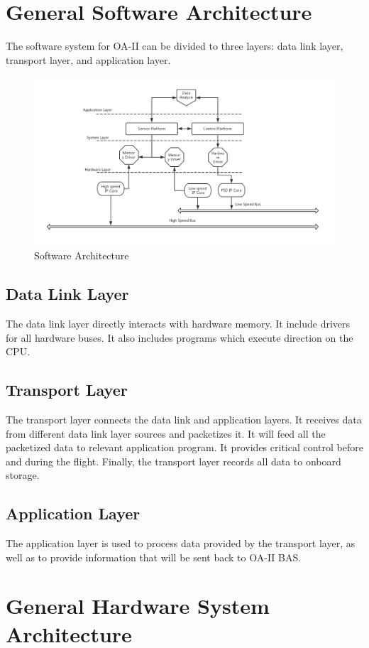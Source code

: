 \documentclass[12pt,article]{memoir}
\begin{document}
\chapter{General Software Architecture}
The software system for OA-II can be divided to three layers: data link layer, transport layer, and application layer.
\begin{figure}[htp]
\includegraphics[width=\textwidth]{ES00002_softarch.png}
\caption{Software Architecture}	
\end{figure}
\section{Data Link Layer}
The data link layer directly interacts with hardware memory. It include drivers for all hardware buses. It also includes programs which execute direction on the CPU.
\section{Transport Layer}
The transport layer connects the data link and application layers. It receives data from different data link layer sources and packetizes it. It will feed all the packetized data to relevant application program. It provides critical control before and during the flight. Finally, the transport layer records all data to onboard storage.
\section{Application Layer}
The application layer is used to process data provided by the transport layer, as well as to provide information that will be sent back to OA-II BAS.

\newpage

\chapter{General Hardware System Architecture}
\end{document}
